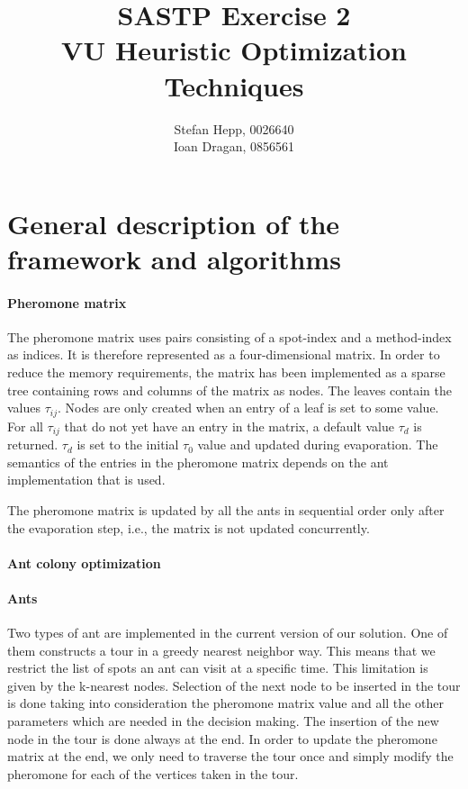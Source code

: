 \documentclass{article}
\title{SASTP Exercise 2\\
{VU Heuristic Optimization Techniques} }
\author{Stefan Hepp, 0026640 \\
Ioan Dragan, 0856561 }
\begin{document}
\maketitle
\section{General description of the framework and algorithms}

\paragraph{Pheromone matrix}

The pheromone matrix uses pairs consisting of a spot-index and a method-index as indices. It is therefore represented as a four-dimensional
matrix. In order to reduce the memory requirements, the matrix has been implemented as a sparse tree containing rows and columns of the
matrix as nodes. The leaves contain the values $\tau_{ij}$. Nodes are only created when an entry of a leaf is set to some value. For all
$\tau_{ij}$ that do not yet have an entry in the matrix, a default value $\tau_d$ is returned. $\tau_d$ is set to the initial $\tau_0$ value 
and updated during evaporation. The semantics of the entries in the pheromone matrix depends on the ant implementation that is used.

The pheromone matrix is updated by all the ants in sequential order only after the evaporation step, i.e., the matrix is not updated
concurrently.

\paragraph{Ant colony optimization}

\paragraph{Ants}

Two types of ant are implemented in the current version of our solution. One of them constructs a tour in a greedy nearest neighbor way. This means that we restrict the list of spots an ant can visit at a specific time. This limitation is given by the k-nearest nodes. Selection of the next node to be inserted in the tour is done taking into consideration the pheromone matrix value and all the other parameters which are needed in the decision making. The insertion of the new node in the tour is done always at the end. In order to update the pheromone matrix at the end, we only need to traverse the tour once and simply modify the pheromone for each of the vertices taken in the tour.
\end{document}
